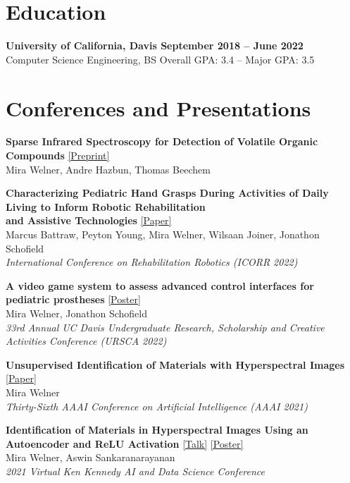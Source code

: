 \documentclass[a4paper]{comcv}
\begin{document}
\section{Education}
\begin{flushleft}
{\bf University of California, Davis \hfill September 2018 -- June 2022}
\\{Computer Science Engineering, BS \hfill {Overall GPA: 3.4 -- Major GPA: 3.5}}
\end{flushleft}

\section{Conferences and Presentations}
\noindent\small\textbf{Sparse Infrared Spectroscopy for Detection of Volatile Organic Compounds }\href{https://arxiv.org/abs/2506.20678}{   [Preprint]}\\
\indent Mira Welner, Andre Hazbun, Thomas Beechem

\noindent\small\textbf{Characterizing Pediatric Hand Grasps During Activities of Daily Living to Inform
Robotic Rehabilitation \\and Assistive Technologies }\href{https://pubmed.ncbi.nlm.nih.gov/36176073/}{  [Paper]}\\
\indent Marcus Battraw, Peyton Young, Mira Welner, Wilsaan Joiner, Jonathon Schofield\\
\indent \textit{International Conference on Rehabilitation Robotics (ICORR 2022)}

\noindent\textbf{A video game system to assess advanced control interfaces for pediatric prostheses  }\href{https://miraewelner.com/docs/schofield_presentation.pdf}{  [Poster]}\\
\indent Mira Welner, Jonathon Schofield\\
\indent \textit{33rd Annual UC Davis Undergraduate Research, Scholarship and Creative Activities Conference (URSCA 2022)}

\noindent\textbf{Unsupervised Identification of Materials with Hyperspectral Images } \href{https://ojs.aaai.org/index.php/AAAI/article/view/21708}{  [Paper]}\\
\indent Mira Welner\\
\indent \textit{Thirty-Sixth AAAI Conference on Artificial Intelligence (AAAI 2021)}

\noindent\textbf{Identification of Materials in Hyperspectral Images Using an Autoencoder and ReLU Activation } \href{https://youtu.be/CvCrZSAqwbI}{[Talk]}   \href{https://mirawelner.com/docs/rice_poster}{[Poster]}\\
\indent Mira Welner, Aswin Sankaranarayanan\\
\indent \textit{2021 Virtual Ken Kennedy AI and Data Science Conference}
\end{document}
